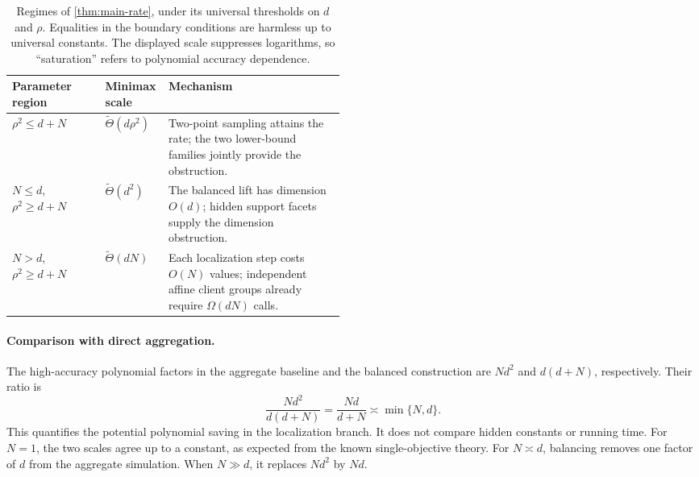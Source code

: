\documentclass[11pt]{article}
\numberwithin{equation}{section}
\theoremstyle{remark}
\theoremstyle{definition}
\begin{document}
\begin{table}[htbp]
\centering
\small
\renewcommand{\arraystretch}{1.2}
\begin{tabularx}{\linewidth}{@{}p{0.29\linewidth}p{0.19\linewidth}Y@{}}
\toprule
Parameter region & Minimax scale & Mechanism \\
\midrule
$\rho^2\le d+N$
& $\widetilde\Theta(d\rho^2)$
& Two-point sampling attains the rate; the two lower-bound families
jointly provide the obstruction. \\
\addlinespace
$N\le d$, $\rho^2\ge d+N$
& $\widetilde\Theta(d^2)$
& The balanced lift has dimension $O(d)$; hidden support facets
supply the dimension obstruction. \\
\addlinespace
$N>d$, $\rho^2\ge d+N$
& $\widetilde\Theta(dN)$
& Each localization step costs $O(N)$ values; independent affine
client groups already require $\Omega(dN)$ calls. \\
\bottomrule
\end{tabularx}
\caption{Regimes of \cref{thm:main-rate}, under its universal
thresholds on $d$ and $\rho$. Equalities in the boundary conditions
are harmless up to universal constants. The displayed scale suppresses
logarithms, so ``saturation'' refers to polynomial accuracy dependence.}
\label{tab:regimes}
\end{table}

\paragraph{Comparison with direct aggregation.}
The high-accuracy polynomial factors in the aggregate baseline and the
balanced construction are $Nd^2$ and $d(d+N)$, respectively. Their ratio
is
\begin{equation}
\frac{Nd^2}{d(d+N)}=\frac{Nd}{d+N}
\asymp\min\{N,d\}.
\label{eq:improvement-factor}
\end{equation}
This quantifies the potential polynomial saving in the localization
branch. It does not compare hidden constants or running time.
For $N=1$, the two scales agree up to a constant, as expected from the
known single-objective theory. For $N\asymp d$, balancing removes one
factor of $d$ from the aggregate simulation. When $N\gg d$, it replaces
$Nd^2$ by $Nd$.
\end{document}
